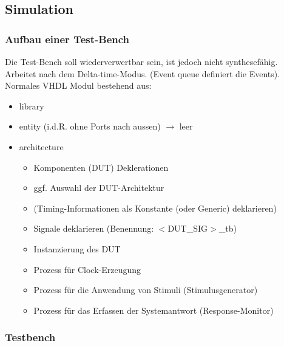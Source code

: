 \begin{multicols}{2}
	\subsection{Simulation}
	\subsubsection{Aufbau einer Test-Bench}
	Die Test-Bench soll wiederverwertbar sein, ist jedoch nicht synthesefähig. Arbeitet nach dem Delta-time-Modus. (Event queue definiert die Events). Normales VHDL Modul bestehend aus:
	\begin{itemize}
	\itemsep0em
		\item library
		\item entity (i.d.R. ohne Ports nach aussen) $\rightarrow$ leer
		\item architecture
		\begin{itemize}
			\itemsep0em
			\item Komponenten (DUT) Deklerationen
			\item ggf. Auswahl der DUT-Architektur
			\item (Timing-Informationen als Konstante (oder 
				Generic) deklarieren)
			\item Signale deklarieren (Benennung: $<$DUT\_SIG$>$\_tb)
			\item Instanzierung des DUT
			\item Prozess für Clock-Erzeugung
			\item Prozess für die Anwendung von Stimuli 
				(Stimulusgenerator)
			\item Prozess für das Erfassen der Systemantwort 
				(Response-Monitor)
		\end{itemize}
	\end{itemize}
\end{multicols}

\begin{multicols}{2}
	\subsubsection{Testbench}
	
\end{multicols}


